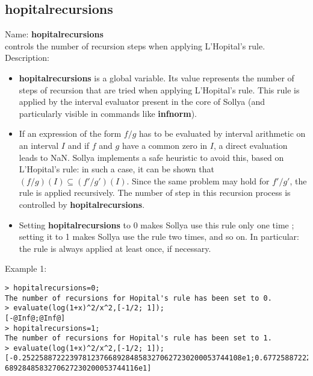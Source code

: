 \subsection{ hopitalrecursions }
\noindent Name: \textbf{hopitalrecursions}\\
controls the number of recursion steps when applying L'Hopital's rule.\\

\noindent Description: \begin{itemize}

\item \textbf{hopitalrecursions} is a global variable. Its value represents the number of steps of
   recursion that are tried when applying L'Hopital's rule. This rule is applied
   by the interval evaluator present in the core of Sollya (and particularly
   visible in commands like \textbf{infnorm}).

\item If an expression of the form $f/g$ has to be evaluated by interval 
   arithmetic on an interval $I$ and if $f$ and $g$ have a common zero
   in $I$, a direct evaluation leads to NaN.
   Sollya implements a safe heuristic to avoid this, based on L'Hopital's rule: in 
   such a case, it can be shown that $(f/g)(I) \subseteq (f'/g')(I)$. Since
   the same problem may hold for $f'/g'$, the rule is applied recursively.
   The number of step in this recursion process is controlled by \textbf{hopitalrecursions}.

\item Setting \textbf{hopitalrecursions} to 0 makes Sollya use this rule only one time ;
   setting it to 1 makes Sollya use the rule two times, and so on.
   In particular: the rule is always applied at least once, if necessary.
\end{itemize}
\noindent Example 1: 
\begin{center}\begin{minipage}{15cm}\begin{Verbatim}[frame=single]
> hopitalrecursions=0;
The number of recursions for Hopital's rule has been set to 0.
> evaluate(log(1+x)^2/x^2,[-1/2; 1]);
[-@Inf@;@Inf@]
> hopitalrecursions=1;
The number of recursions for Hopital's rule has been set to 1.
> evaluate(log(1+x)^2/x^2,[-1/2; 1]);
[-0.252258872223978123766892848583270627230200053744108e1;0.67725887222397812376
6892848583270627230200053744116e1]
\end{Verbatim}
\end{minipage}\end{center}
